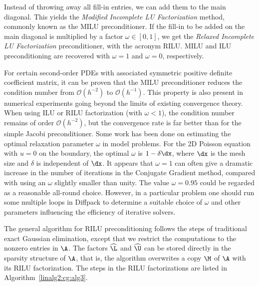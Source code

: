 Instead of throwing away all fill-in entries, we can add them to the
main diagonal. This yields the \emph{Modified Incomplete LU Factorization}
method, commonly known as the MILU preconditioner.
If the fill-in to be added on the main diagonal is multiplied by a
factor $\omega\in [0,1]$, we get the \emph{Relaxed Incomplete LU Factorization}
preconditioner, with the acronym RILU.
MILU and ILU preconditioning are recovered with $\omega =1$ and $\omega =0$,
respectively.

For certain second-order PDEs with associated
symmetric positive definite coefficient matrix, it can be
proven that the MILU preconditioner reduces the condition number from
$\mathcal{O}(h^{-2})$ to $\mathcal{O }(h^{-1})$.
This property is also present in numerical
experiments going beyond the limits of existing convergence theory.
When using ILU or  RILU factorization (with $\omega < 1$), the
condition number remains of order $\mathcal{O}(h^{-2})$, but the convergence rate
is far better than for the simple Jacobi preconditioner.
Some work has been done on estimating the optimal
relaxation parameter $\omega$ in model problems. For the 2D Poisson
equation with $u=0$ on the boundary, the optimal $\omega$ is
$1-\delta \dx$, where $\dx$ is the mesh size and $\delta$ is
independent of $\dx$.
It appears that $\omega =1$ can often give a dramatic increase in the
number of iterations in the Conjugate Gradient method, compared with
using an $\omega$ slightly smaller than unity. The value $\omega =0.95$
could be regarded as a reasonable all-round choice.
However, in a particular problem one should run some multiple loops
in Diffpack to determine a suitable choice of $\omega$ and other
parameters influencing the efficiency of iterative solvers.

The general algorithm for RILU preconditioning follows the steps of
traditional exact Gaussian elimination, except that
we restrict the computations to the nonzero entries in $\A$.
The factors $\widehat\L$ and $\widehat\U$ can be stored directly in the
sparsity structure of $\A$, that is, the algorithm overwrites a copy
$\M$ of $\A$ with
its RILU factorization. The steps in the RILU factorizations are
listed in Algorithm~\ref{linalg2:cg:alg3}.


